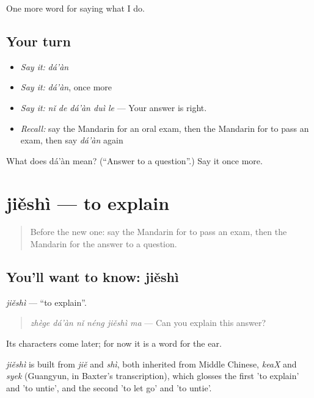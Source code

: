 \begin{grammarlens}[title={What you've built}]
One more word for saying what I do.
\end{grammarlens}

\subsection*{Your turn}
\begin{itemize}
\raggedright
  \item \emph{Say it:} \emph{dá'àn}
  \item \emph{Say it:} \emph{dá'àn}, once more
  \item \emph{Say it:} \emph{nǐ de dá'àn duì le} — Your answer is right.
  \item \emph{Recall:} say the Mandarin for an oral exam, then the Mandarin for to pass an exam, then say \emph{dá'àn} again
\end{itemize}

\begin{tcolorbox}[breakable,colback=teal!4,colframe=teal!35!black,title={Before you move on}]
What does dá'àn mean? (\textquotedblleft{}Answer to a question\textquotedblright{}.) Say it once more.
\end{tcolorbox}
\section[jiěshì]{jiěshì — to explain}

\label{lesson:ZH-C268-jieshi}



\begin{quote}
Before the new one: say the Mandarin for to pass an exam, then the Mandarin for the answer to a question.
\end{quote}

\subsection*{You'll want to know: jiěshì}
\emph{jiěshì} — \textquotedblleft{}to explain\textquotedblright{}.

\begin{quote}
\emph{zhège dá'àn nǐ néng jiěshì ma} — Can you explain this answer?
\end{quote}

Its characters come later; for now it is a word for the ear.

\begin{cousinweb}
\emph{jiěshì} is built from \emph{jiě} and \emph{shì}, both inherited from Middle Chinese, \emph{keaX} and \emph{syek} (Guangyun, in Baxter's transcription), which glosses the first 'to explain' and 'to untie', and the second 'to let go' and 'to untie'.
\end{cousinweb}

